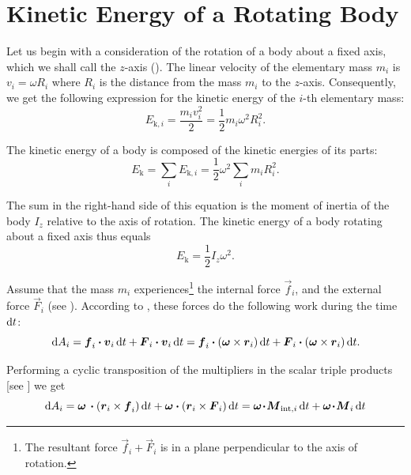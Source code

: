 \section{Kinetic Energy of a Rotating Body}\label{sec:5_6}

Let us begin with a consideration of the rotation of a body about a fixed axis, which we shall call the $z$-axis (). The linear velocity of the elementary mass $m_i$ is $v_i=\omega R_i$ where $R_i$ is the distance from the mass $m_i$ to the $z$-axis. Consequently, we get the following expression for the kinetic energy of the $i$-th elementary mass:
\begin{equation*}
	E_{\text{k},i} = \frac{m_i v_i^2}{2} = \frac{1}{2}m_i \omega^2 R_i^2.
\end{equation*}

\noindent
The kinetic energy of a body is composed of the kinetic energies of its parts:
\begin{equation*}
	E_{\text{k}} = \sum_i E_{\text{k},i} = \frac{1}{2}\omega^2 \sum_i m_i R_i^2.
\end{equation*}

\noindent
The sum in the right-hand side of this equation is the moment of inertia of the body $I_z$ relative to the axis of rotation. The kinetic energy of a body rotating about a fixed axis thus equals
\begin{equation}\label{eq:5_46}
	E_{\text{k}} = \frac{1}{2} I_z \omega^2.
\end{equation}

Assume that the mass $m_i$ experiences\footnote{The resultant force $\vec{f}_i+\vec{F}_i$ is in a plane perpendicular to the axis of rotation.} the internal force $\vec{f}_i$, and the external force $\vec{F}_i$ (see ). According to , these forces do the following work during the time $\mathrm{d} t$:
\begin{equation*}
\mathrm{d} A_i = \boldsymbol{f}_{i}\boldsymbol{\cdot}\boldsymbol{v}_{i}\,\mathrm{d} t + \boldsymbol{F}_{i}\boldsymbol{\cdot}\boldsymbol{v}_{i}\,\mathrm{d} t = \boldsymbol{f}_i\boldsymbol{\cdot}(\boldsymbol{\omega}\times\boldsymbol{r}_i)\,\mathrm{d} t + \boldsymbol{F}_i\boldsymbol{\cdot}(\boldsymbol{\omega}\times\boldsymbol{r}_i)\,\mathrm{d} t.
\end{equation*}

\noindent
Performing a cyclic transposition of the multipliers in the scalar triple products [see ] we get
\begin{equation}\label{eq:5_47}
\mathrm{d} A_i = \boldsymbol{\omega}\,\boldsymbol{\cdot}(\boldsymbol{r}_{i}\times\boldsymbol{f}_{i})\,\mathrm{d} t + \boldsymbol{\omega}\boldsymbol{\cdot}(\boldsymbol{r}_{i}\times\boldsymbol{F}_{i})\,\mathrm{d} t = \boldsymbol{\omega\!\cdot\!M}_{\text{int},i}\,\mathrm{d} t + \boldsymbol{\omega\!\cdot\!M}_i\,\mathrm{d} t
\end{equation}

